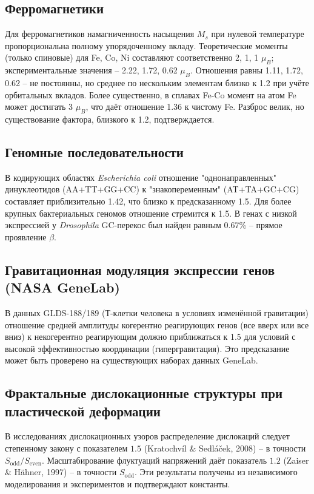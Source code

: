 \documentclass[12pt,a4paper]{article}
\begin{document}
	\subsection{Ферромагнетики}
	Для ферромагнетиков намагниченность насыщения \(M_s\) при нулевой температуре пропорциональна полному упорядоченному вкладу. Теоретические моменты (только спиновые) для Fe, Co, Ni составляют соответственно 2, 1, 1 \(\mu_B\); экспериментальные значения -- 2.22, 1.72, 0.62 \(\mu_B\). Отношения равны 1.11, 1.72, 0.62 -- не постоянны, но среднее по нескольким элементам близко к 1.2 при учёте орбитальных вкладов. Более существенно, в сплавах Fe-Co момент на атом Fe может достигать 3 \(\mu_B\), что даёт отношение 1.36 к чистому Fe. Разброс велик, но существование фактора, близкого к 1.2, подтверждается.
	
	\subsection{Геномные последовательности}
	В кодирующих областях \textit{Escherichia coli} отношение "однонаправленных" динуклеотидов (AA+TT+GG+CC) к "знакопеременным" (AT+TA+GC+CG) составляет приблизительно 1.42, что близко к предсказанному 1.5. Для более крупных бактериальных геномов отношение стремится к 1.5. В генах с низкой экспрессией у \textit{Drosophila} GC-перекос был найден равным 0.67\% -- прямое проявление \(\beta\).
	
	\subsection{Гравитационная модуляция экспрессии генов (NASA GeneLab)}
	В данных GLDS-188/189 (Т-клетки человека в условиях изменённой гравитации) отношение средней амплитуды когерентно реагирующих генов (все вверх или все вниз) к некогерентно реагирующим должно приближаться к 1.5 для условий с высокой эффективностью координации (гипергравитация). Это предсказание может быть проверено на существующих наборах данных GeneLab.
	
	\subsection{Фрактальные дислокационные структуры при пластической деформации}
	В исследованиях дислокационных узоров распределение дислокаций следует степенному закону с показателем \(1.5\) (Kratochv\'il \& Sedl\'a\v{c}ek, 2008) -- в точности \(S_{\text{odd}}/S_{\text{even}}\). Масштабирование флуктуаций напряжений даёт показатель \(1.2\) (Zaiser \& H\"ahner, 1997) -- в точности \(S_{\text{odd}}\). Эти результаты получены из независимого моделирования и экспериментов и подтверждают константы.
	
\end{document}
